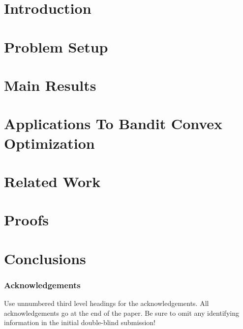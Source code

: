 \documentclass[11pt,letterpaper,english]{article}
\begin{document}
\section{Introduction}
\label{sec:intro}


\section{Problem Setup}
\label{sec:problem}


\section{Main Results}
\label{sec:results}


\section{Applications To Bandit Convex Optimization}
\label{sec:ex}


\section{Related Work}
\label{sec:related}


\section{Proofs}
\label{sec:proofs}
%


% 
%

\section{Conclusions}
\label{sec:conc}






\subsubsection*{Acknowledgements}

Use unnumbered third level headings for the acknowledgements.  All
acknowledgements go at the end of the paper.  Be sure to omit any
identifying information in the initial double-blind submission!
\fi

\end{document}
